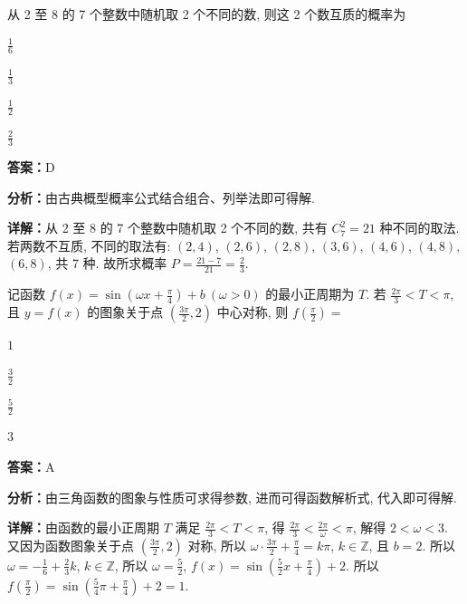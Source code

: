 \begin{question}[points=5]
从 2 至 8 的 7 个整数中随机取 2 个不同的数, 则这 2 个数互质的概率为
\begin{choices}
  \item $\frac{1}{6}$
  \item $\frac{1}{3}$
  \item $\frac{1}{2}$
  \item $\frac{2}{3}$
\end{choices}
\begin{solution}
\textbf{答案：}D

\textbf{分析：}由古典概型概率公式结合组合、列举法即可得解.

\textbf{详解：}从 2 至 8 的 7 个整数中随机取 2 个不同的数, 共有 $C_7^2 = 21$ 种不同的取法. 若两数不互质, 不同的取法有: $(2,4)$, $(2,6)$, $(2,8)$, $(3,6)$, $(4,6)$, $(4,8)$, $(6,8)$, 共 7 种. 故所求概率 $P = \frac{21 - 7}{21} = \frac{2}{3}$.
\end{solution}
\end{question}

\begin{question}[points=5]
记函数 $f(x) = \sin\left(\omega x + \frac{\pi}{4}\right) + b\ (\omega > 0)$ 的最小正周期为 $T$. 若 $\frac{2\pi}{3} < T < \pi$, 且 $y = f(x)$ 的图象关于点 $\left(\frac{3\pi}{2}, 2\right)$ 中心对称, 则 $f\left(\frac{\pi}{2}\right) =$
\begin{choices}
  \item $1$
  \item $\frac{3}{2}$
  \item $\frac{5}{2}$
  \item $3$
\end{choices}
\begin{solution}
\textbf{答案：}A

\textbf{分析：}由三角函数的图象与性质可求得参数, 进而可得函数解析式, 代入即可得解.

\textbf{详解：}由函数的最小正周期 $T$ 满足 $\frac{2\pi}{3} < T < \pi$, 得 $\frac{2\pi}{3} < \frac{2\pi}{\omega} < \pi$, 解得 $2 < \omega < 3$. 又因为函数图象关于点 $\left(\frac{3\pi}{2}, 2\right)$ 对称, 所以 $\omega \cdot \frac{3\pi}{2} + \frac{\pi}{4} = k\pi$, $k \in \mathbb{Z}$, 且 $b = 2$. 所以 $\omega = -\frac{1}{6} + \frac{2}{3}k$, $k \in \mathbb{Z}$, 所以 $\omega = \frac{5}{2}$, $f(x) = \sin\left(\frac{5}{2}x + \frac{\pi}{4}\right) + 2$. 所以 $f\left(\frac{\pi}{2}\right) = \sin\left(\frac{5}{4}\pi + \frac{\pi}{4}\right) + 2 = 1$.
\end{solution}
\end{question}

